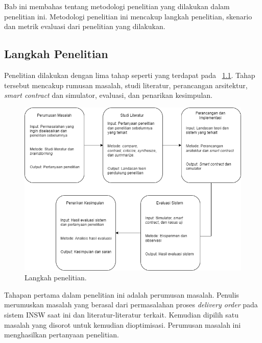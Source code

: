 \chapter{\babTiga}
\label{bab:3}

Bab ini membahas tentang metodologi penelitian yang dilakukan dalam penelitian ini. Metodologi penelitian ini mencakup langkah penelitian, skenario dan metrik evaluasi dari penelitian yang dilakukan.


\section{Langkah Penelitian}
\label{sec:langkahPenelitian}

Penelitian dilakukan dengan lima tahap seperti yang terdapat pada 
\pic~\ref{fig:metode}. Tahap tersebut mencakup rumusan masalah, studi literatur, perancangan arsitektur, \textit{smart contract} dan simulator, evaluasi, dan penarikan kesimpulan.

\begin{figure}
	\centering
	\includegraphics[width=\textwidth]{assets/pics/metode.png}
	\caption{Langkah penelitian.}
	\label{fig:metode}
\end{figure}

Tahapan pertama dalam penelitian ini adalah perumusan masalah. Penulis merumuskan masalah yang berasal dari permasalahan proses \textit{delivery order} pada sistem INSW saat ini dan literatur-literatur terkait. Kemudian dipilih satu masalah yang disorot untuk kemudian dioptimisasi. Perumusan masalah ini menghasilkan pertanyaan penelitian.

